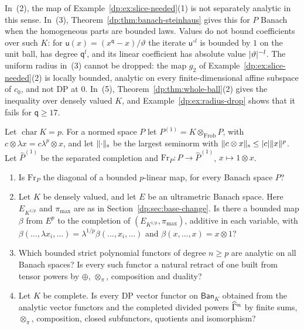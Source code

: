 In~(2), the map of Example~\ref{dp:ex:slice-needed}(1) is not separately analytic in this sense. In~(3), Theorem~\ref{dp:thm:banach-steinhaus} gives this for $P$ Banach when the homogeneous parts are bounded laws. Values do not bound coefficients over such $K$: for $\mathsf u(x)=(x^{\mathsf q}-x)/\vartheta$ the iterate $\mathsf u^{\circ l}$ is bounded by $1$ on the unit ball, has degree $\mathsf q^l$, and its linear coefficient has absolute value $\lvert \vartheta\rvert^{-l}$. The uniform radius in~(3) cannot be dropped: the map $g_2$ of Example~\ref{dp:ex:slice-needed}(2) is locally bounded, analytic on every finite-dimensional affine subspace of $c_0$, and not DP at $0$. In~(5), Theorem~\ref{dp:thm:whole-ball}(2) gives the inequality over densely valued $K$, and Example~\ref{dp:ex:radius-drop} shows that it fails for $\mathsf q\ge17$.

\begin{question}\label{dp:q:functors}
Let $\operatorname{char}K=p$. For a normed space $P$ let $P^{(1)}=K\otimes_{\mathrm{Frob}}P$, with $c\otimes\lambda x=c\lambda^p\otimes x$, and let $\lVert \cdot\rVert_{\mathrm s}$ be the largest seminorm with $\lVert c\otimes x\rVert_{\mathrm s}\le\lvert c\rvert\lVert x\rVert^p$. Let $\widehat P^{(1)}$ be the separated completion and $\mathrm{Fr}_P\colon P\to\widehat P^{(1)}$, $x\mapsto1\otimes x$.
\begin{enumerate}
\item Is $\mathrm{Fr}_P$ the diagonal of a bounded $p$\nobreakdash-linear map, for every Banach space $P$?
\item Let $K$ be densely valued, and let $E$ be an ultrametric Banach space. Here $E_{K^{1/p}}$ and $\pi_{\max}$ are as in Section~\ref{dp:sec:base-change}. Is there a bounded map $\beta$ from $E^p$ to the completion of $(E_{K^{1/p}},\pi_{\max})$, additive in each variable, with $\beta(\dots,\lambda x_i,\dots)=\lambda^{1/p}\beta(\dots,x_i,\dots)$ and $\beta(x,\dots,x)=x\otimes1$?
\item Which bounded strict polynomial functors of degree $n\ge p$ are analytic on all Banach spaces? Is every such functor a natural retract of one built from tensor powers by $\oplus$, $\otimes_\pi$, composition and duality?
\item Let $K$ be complete. Is every DP vector functor on $\mathsf{Ban}_K$ obtained from the analytic vector functors and the completed divided powers $\widehat\Gamma^n$ by finite sums, $\otimes_\pi$, composition, closed subfunctors, quotients and isomorphism?
\end{enumerate}
\end{question}

